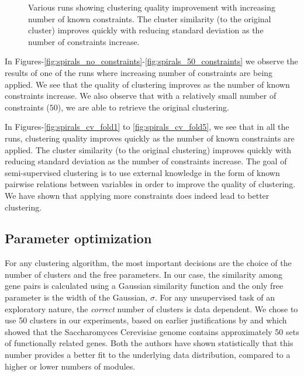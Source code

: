 \begin{figure}[p]
{\label{fig:spirals_cv_fold5}
}
\label{fig:spirals_cv}
\caption[Various runs showing clustering quality improvement with increasing number of known constraints.]{Various runs showing 
clustering quality improvement with increasing number of known constraints. The cluster similarity (to the original cluster) improves quickly with 
reducing standard deviation as the number of constraints increase.}
\end{figure}

In Figures-\ref{fig:spirals_no_constraints}-\ref{fig:spirals_50_constraints} we observe the results of one of the runs where increasing number of constraints are being applied. 
We see that the quality of clustering improves as the number of known constraints increase. We also observe that with a relatively small number of 
constraints ($50$), we are able to retrieve the original clustering.  

In Figures-\ref{fig:spirals_cv_fold1} to \ref{fig:spirals_cv_fold5}, we see that in all the runs, clustering quality improves quickly as the number of known constraints are applied. 
The cluster similarity (to the original clustering) improves quickly with reducing standard deviation as the number of constraints increase. The goal of 
semi-supervised clustering is to use external knowledge in the form of known pairwise relations between variables 
in order to improve the quality of clustering. We have shown that applying more constraints does indeed lead to better clustering.

\subsection{Parameter optimization} \label{chap2:sec:param_opt}
For any clustering algorithm, the most important decisions are the choice of the number of clusters and the free parameters. In our case, the similarity among gene pairs is calculated using a Gaussian similarity function and the only free parameter is the width of the Gaussian, $\sigma$. For any unsupervised task of an exploratory nature, the \textit{correct} number of clusters is data dependent. We chose to use 50 clusters in our experiments, based on earlier justifications by \citet{ihmels02revealing} and \citet{segal03module} which showed that the Saccharomyces Cerevisiae genome contains approximately 50 sets of functionally related genes. Both the authors have shown statistically that this number provides a better fit to the underlying data distribution, compared to a higher or lower numbers of modules.

